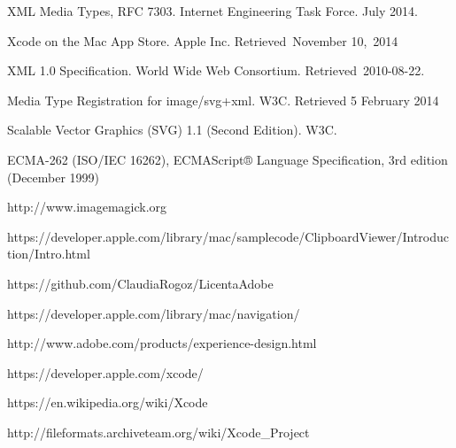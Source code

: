 \begin{thebibliography}{9}
XML Media Types, RFC 7303. Internet Engineering Task Force. July 2014.
 
Xcode on the Mac App Store. Apple Inc. Retrieved November 10, 2014
 
XML 1.0 Specification. World Wide Web Consortium. Retrieved 2010-08-22.

Media Type Registration for image/svg+xml. W3C. Retrieved 5 February 2014 

Scalable Vector Graphics (SVG) 1.1 (Second Edition). W3C.

ECMA-262 (ISO/IEC 16262), ECMAScript® Language Specification, 3rd edition (December 1999)

http://www.imagemagick.org

https://developer.apple.com/library/mac/samplecode/ClipboardViewer/Introduction/Intro.html

https://github.com/ClaudiaRogoz/LicentaAdobe

https://developer.apple.com/library/mac/navigation/

http://www.adobe.com/products/experience-design.html

https://developer.apple.com/xcode/

https://en.wikipedia.org/wiki/Xcode

http://fileformats.archiveteam.org/wiki/Xcode_Project
\end{thebibliography}

